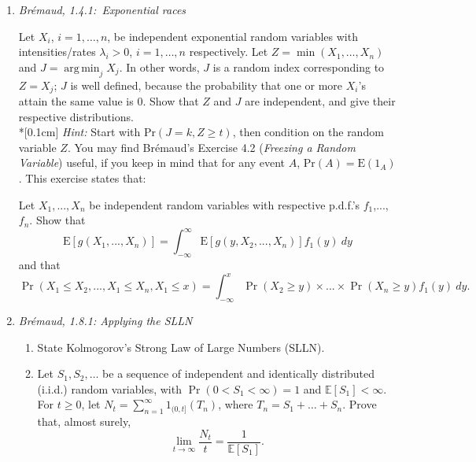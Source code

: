 \documentclass{article} %
\DeclareMathOperator*{\argmin}{arg\,min}
\begin{document}
\begin{enumerate}
\item {\it Br\'{e}maud, 1.4.1:~Exponential races}

 Let $X_i$, $i=1,\dots,n$, be independent exponential
random variables with intensities/rates $\lambda_i >0$, $i=1,\dots,n$
respectively. Let
$Z = \min(X_1,\dots,X_n)$ and $\displaystyle J = \argmin_j X_j$. In other
words, $J$ is a random index corresponding to $Z = X_j$; $J$ is well defined,
because the probability that one or more $X_i$'s attain the same value is $0$.
Show that $Z$ and $J$ are independent, and give their respective
distributions. \\*[0.1cm]
{\it Hint:} Start with $\text{Pr}(J=k,Z \ge t)$, then condition on the random
variable $Z$. You may find Br\'{e}maud's Exercise 4.2
({\it Freezing a Random Variable}) useful, if you keep in mind that for any
event $A$, $\text{Pr}(A) = \text{E}(1_A)$. This exercise states that:

Let $X_1,...,X_n$ be independent random variables with respective p.d.f.'s
$f_1$,...,$f_n$. Show that
$$\mbox{E}[ g(X_1,...,X_n)] = \int_{-\infty}^{\infty} \mbox{E}[g(y,X_2,...,X_n)] f_1(y) ~dy$$
and that
$$\Pr( X_1 \leq X_2,...,X_1 \leq X_n,X_1 \leq x) = \int_{-\infty}^x \Pr(X_2 \geq y) \times ...\times \Pr(X_n \geq y) f_1(y)~dy.$$

\item {\it Br\'{e}maud, 1.8.1: Applying the SLLN}
  \begin{enumerate}
  \item State Kolmogorov's Strong Law of Large Numbers (SLLN).
  \item Let $S_1,S_2,\dots$ be a sequence of independent and
    identically distributed (i.i.d.) random variables, with
    $\Pr(0<S_1<\infty)=1$ and $\mathbb{E}[S_1]<\infty$.  For $t\ge 0$,
    let $N_t=\sum_{n=1}^\infty 1_{(0,t]}(T_n)$, where
    $T_n=S_1+\dots+S_n$.  Prove that, almost surely,
    \[
    \lim_{t\to\infty} \frac{N_t}{t} = \frac{1}{\mathbb{E}[S_1]}.
    \]
  \end{enumerate}

\end{enumerate}
\end{document}

